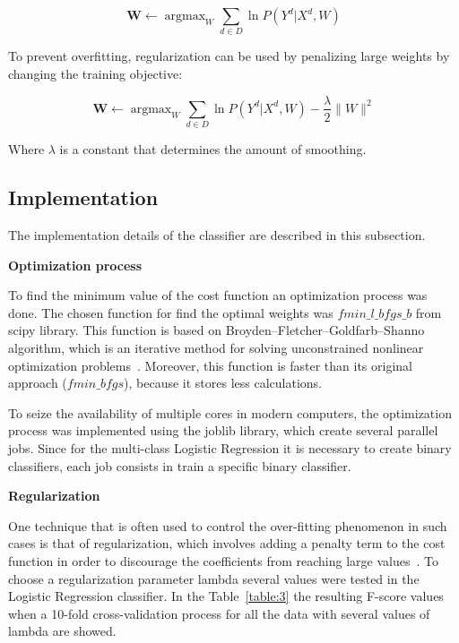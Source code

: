 \documentclass[letterpaper,10pt]{article}
\DeclareMathOperator*{\argmax}{argmax}
\theoremstyle{mytheor}
\begin{document}
\begin{equation}
\boldsymbol{W} \leftarrow \argmax_{W} \sum_{d \in D} \ln P(Y^d|X^d, W)
\end{equation}

To prevent overfitting, regularization can be used by penalizing large weights by changing the training objective:

\begin{equation}
\boldsymbol{W} \leftarrow \argmax_{W} \sum_{d \in D} \ln P(Y^d|X^d, W) - \frac{\lambda}{2}\parallel W \parallel^2 
\end{equation}

Where $\lambda$ is a constant that determines the amount of smoothing. 

\subsection{Implementation}

The implementation details of the classifier are described in this subsection.

\textbf{Optimization process}

To find the minimum value of the cost function an optimization process was done. The chosen function for find the optimal weights was $fmin\_l\_bfgs\_b$ from scipy library. This function is based on Broyden–Fletcher–Goldfarb–Shanno algorithm, which is an iterative method for solving unconstrained nonlinear optimization problems~\cite{wiki:bfgs}. Moreover, this function is faster than its original approach ($fmin\_bfgs$), because it stores less calculations. 

To seize the availability of multiple cores in modern computers, the optimization process was implemented using the joblib library, which create several parallel jobs. Since for the multi-class Logistic Regression it is necessary to create binary classifiers, each job consists in train a specific binary classifier.

\textbf{Regularization} 

One technique that is often used to control the over-fitting phenomenon in such cases is that of regularization, which involves adding a penalty term to the cost function in order to discourage the coefficients from reaching large values~\cite{bishop2007pattern}.
To choose a regularization parameter lambda several values were tested in the Logistic Regression classifier. In the Table~\ref{table:3} the resulting F-score values when a 10-fold cross-validation process for all the data with several values of lambda are showed.
\end{document}

